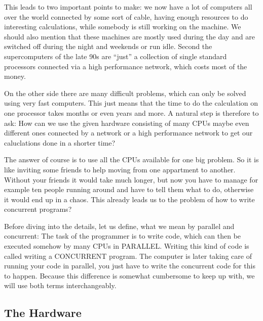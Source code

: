 This leads to two important points to make: we now have a lot of
computers all over the world connected by some sort of cable,
having enough resources to do 
interesting calculations, while somebody is still working on the
machine. We should also mention that these machines are mostly used
during the day and are switched off during the night and weekends
or run idle. Second the supercomputers of the late 90s are ``just'' 
a collection of single standard processors connected via a high
performance network, which costs most of the money. 

On the other side there are many difficult problems, which can
only be solved using very fast computers. This just means that
the time to do the calculation on one processor takes months or
even years and more. A natural step 
is therefore to ask: How can we use the given hardware consisting
of many CPUs maybe even different ones connected by a network or
a high performance network to get our caluclations done in a
shorter time?

The answer of course is to use all the CPUs available for one big 
problem. So it is like inviting some friends to help moving
from one appartment to another. Without your friends it would 
take much longer, but now you have to manage for example ten people running
around and have to tell them what to do, otherwise it would end up
in a chaos. This already leads us to the problem of how to write
concurrent programs?

Before diving into the details, let us define, what we mean by parallel
and concurrent:
The task of the programmer is to write code, which can then be executed
somehow by many CPUs in PARALLEL. Writing this kind of code is called
writing a CONCURRENT program. The computer is later 
taking care of running your code in parallel, you just have to write 
the concurrent code for this to happen. Because this difference
is somewhat cumbersome to keep up with, we will use both terms
interchangeably.

\subsection{The Hardware}

